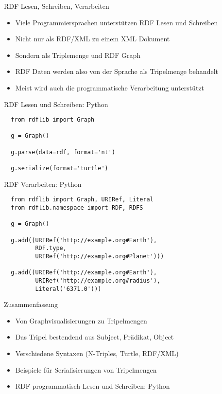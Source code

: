 \documentclass{beamer}
\begin{document}
\begin{frame}{RDF Lesen, Schreiben, Verarbeiten}
	
	\begin{itemize}
		\item Viele Programmiersprachen unterstützen RDF Lesen und Schreiben
		\item Nicht nur als RDF/XML zu einem XML Dokument
		\item Sondern als Triplemenge und RDF Graph
		\item RDF Daten werden also von der Sprache als Tripelmenge behandelt
		\item Meist wird auch die programmatische Verarbeitung unterstützt
	\end{itemize}
	
\end{frame}

\begin{frame}[fragile]{RDF Lesen und Schreiben: Python}
	
	\begin{lstlisting}
  from rdflib import Graph	
  
  g = Graph()
  
  g.parse(data=rdf, format='nt')
  
  g.serialize(format='turtle')
	\end{lstlisting}
	
\end{frame}

\begin{frame}[fragile]{RDF Verarbeiten: Python}
	
	\begin{lstlisting}
  from rdflib import Graph, URIRef, Literal
  from rdflib.namespace import RDF, RDFS
  
  g = Graph()
  
  g.add((URIRef('http://example.org#Earth'), 
         RDF.type, 
         URIRef('http://example.org#Planet')))
        
  g.add((URIRef('http://example.org#Earth'), 
         URIRef('http://example.org#radius'), 
         Literal('6371.0')))

	\end{lstlisting}
	
\end{frame}

\begin{frame}{Zusammenfassung}
	
	\begin{itemize}
		\item Von Graphvisualisierungen zu Tripelmengen
		\item Das Tripel bestendend aus Subject, Prädikat, Object
		\item Verschiedene Syntaxen (N-Triples, Turtle, RDF/XML)
		\item Beispiele für Serialisierungen von Tripelmengen
		\item RDF programmatisch Lesen und Schreiben: Python
	\end{itemize}
	
\end{frame}
\end{document}
